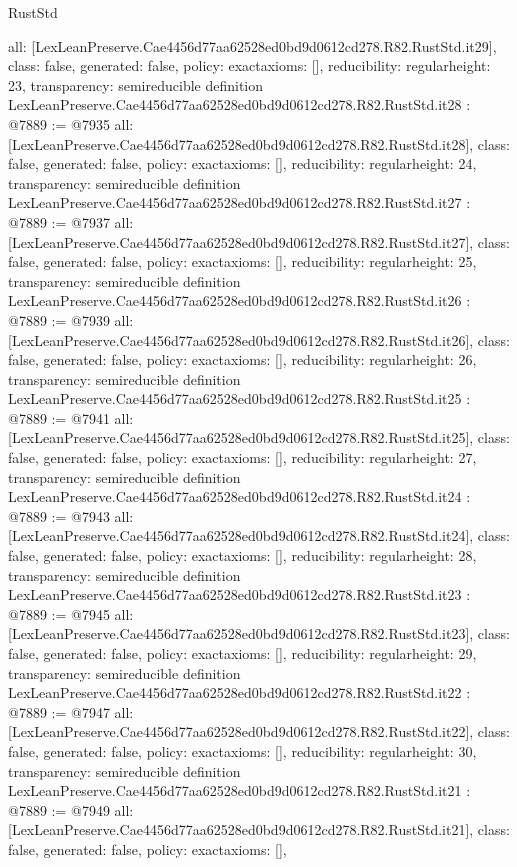 \begin{lexlean}{RustStd}
\begin{coremodule}
{  all: [LexLeanPreserve.Cae4456d77aa62528ed0bd9d0612cd278.R82.RustStd.it29],
  class: false,
  generated: false,
  policy: exact{axioms: []},
  reducibility: regular{height: 23},
  transparency: semireducible
}
definition LexLeanPreserve.Cae4456d77aa62528ed0bd9d0612cd278.R82.RustStd.it28 : @7889 := @7935 {
  all: [LexLeanPreserve.Cae4456d77aa62528ed0bd9d0612cd278.R82.RustStd.it28],
  class: false,
  generated: false,
  policy: exact{axioms: []},
  reducibility: regular{height: 24},
  transparency: semireducible
}
definition LexLeanPreserve.Cae4456d77aa62528ed0bd9d0612cd278.R82.RustStd.it27 : @7889 := @7937 {
  all: [LexLeanPreserve.Cae4456d77aa62528ed0bd9d0612cd278.R82.RustStd.it27],
  class: false,
  generated: false,
  policy: exact{axioms: []},
  reducibility: regular{height: 25},
  transparency: semireducible
}
definition LexLeanPreserve.Cae4456d77aa62528ed0bd9d0612cd278.R82.RustStd.it26 : @7889 := @7939 {
  all: [LexLeanPreserve.Cae4456d77aa62528ed0bd9d0612cd278.R82.RustStd.it26],
  class: false,
  generated: false,
  policy: exact{axioms: []},
  reducibility: regular{height: 26},
  transparency: semireducible
}
definition LexLeanPreserve.Cae4456d77aa62528ed0bd9d0612cd278.R82.RustStd.it25 : @7889 := @7941 {
  all: [LexLeanPreserve.Cae4456d77aa62528ed0bd9d0612cd278.R82.RustStd.it25],
  class: false,
  generated: false,
  policy: exact{axioms: []},
  reducibility: regular{height: 27},
  transparency: semireducible
}
definition LexLeanPreserve.Cae4456d77aa62528ed0bd9d0612cd278.R82.RustStd.it24 : @7889 := @7943 {
  all: [LexLeanPreserve.Cae4456d77aa62528ed0bd9d0612cd278.R82.RustStd.it24],
  class: false,
  generated: false,
  policy: exact{axioms: []},
  reducibility: regular{height: 28},
  transparency: semireducible
}
definition LexLeanPreserve.Cae4456d77aa62528ed0bd9d0612cd278.R82.RustStd.it23 : @7889 := @7945 {
  all: [LexLeanPreserve.Cae4456d77aa62528ed0bd9d0612cd278.R82.RustStd.it23],
  class: false,
  generated: false,
  policy: exact{axioms: []},
  reducibility: regular{height: 29},
  transparency: semireducible
}
definition LexLeanPreserve.Cae4456d77aa62528ed0bd9d0612cd278.R82.RustStd.it22 : @7889 := @7947 {
  all: [LexLeanPreserve.Cae4456d77aa62528ed0bd9d0612cd278.R82.RustStd.it22],
  class: false,
  generated: false,
  policy: exact{axioms: []},
  reducibility: regular{height: 30},
  transparency: semireducible
}
definition LexLeanPreserve.Cae4456d77aa62528ed0bd9d0612cd278.R82.RustStd.it21 : @7889 := @7949 {
  all: [LexLeanPreserve.Cae4456d77aa62528ed0bd9d0612cd278.R82.RustStd.it21],
  class: false,
  generated: false,
  policy: exact{axioms: []},
}
\end{coremodule}
\end{lexlean}
